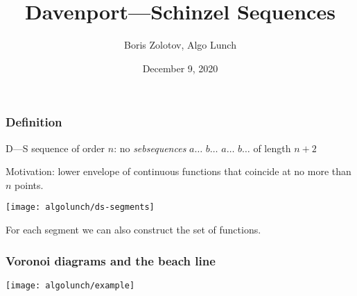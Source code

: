 \documentclass[aspectratio=1610,12pt,notheorems]{beamer}
\title{\bfseries Davenport—Schinzel Sequences}
\author{Boris Zolotov, Algo Lunch}
\institute[\ ]{\ }
\date{December 9, 2020}
\begin{document}
\frame{\titlepage}

\begin{frame} \frametitle{Definition}

\begin{block}{\vspace*{-3ex}}
	D—S sequence of order $n$: no {\it sebsequences} $a \ldots$ $b\ldots$ $a \ldots$ $b\ldots$ of length $n+2$
\end{block}

	Motivation: lower envelope of continuous functions that coincide at no more than $n$ points.

\begin{center}
	\texttt{[image: algolunch/ds-segments]}
\end{center}

	For each segment we can also construct the set of functions. \vspace{1cm}

\end{frame}

\begin{frame} \frametitle{Voronoi diagrams and the beach line}
\begin{center}
	\texttt{[image: algolunch/example]}
\end{center}
\end{frame}
\end{document}
